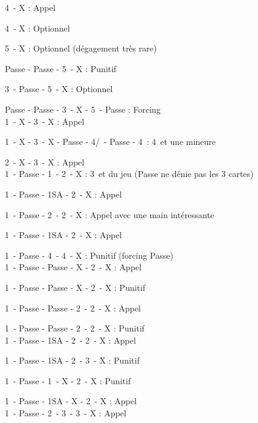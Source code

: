 \documentclass[a4paper, oneside, 11pt]{report}
\begin{document}
		4\coeur\ - X : Appel
		
		4\pique\ - X : Optionnel
		
		5\trefle\ - X : Optionnel (dégagement très rare)
		
		Passe - Passe - 5\trefle\ - X : Punitif
		
		3\trefle\ - Passe - 5\trefle\ - X : Optionnel
		
		Passe - Passe - 3\trefle\ - X - 5\trefle\ - Passe : Forcing\\
		
		1\pique\ - X - 3\pique\ - X : Appel
		
		1\pique\ - X - 3\pique\ - X - Passe - 4\trefle/\carreau\ - Passe - 4\coeur\ : 4\coeur\ et une mineure
		
		2\pique\ - X - 3\pique\ - X : Appel\\
		
		1\carreau\ - Passe - 1\coeur\ - 2\trefle\ - X : 3\coeur\ et du jeu (Passe ne dénie pas les 3 cartes)
		
		1\pique\ - Passe - 1SA - 2\trefle\ - X : Appel
		
		1\pique\ - Passe - 2\trefle\ - 2\coeur\ - X : Appel avec une main intéressante
		
		1\carreau\ - Passe - 1SA - 2\pique\ - X : Appel
		
		1\coeur\ - Passe - 4\coeur\ - 4\pique\ - X : Punitif (forcing Passe)\\
		
		1\pique\ - Passe - Passe - X - 2\pique\ - X : Appel
		
		1\pique\ - Passe - Passe - X - 2\trefle\ - X : Punitif
		
		1\pique\ - Passe - Passe - 2\coeur\ - 2\pique\ - X : Appel
		
		1\pique\ - Passe - Passe - 2\carreau\ - 2\coeur\ - X : Punitif\\
		
		1\pique\ - Passe - 1SA - 2\coeur\ - 2\pique\ - X : Appel
		
		1\pique\ - Passe - 1SA - 2\coeur\ - 3\carreau\ - X : Punitif
		
		1\carreau\ - Passe - 1\coeur\ - X - 2\carreau\ - X : Punitif
		
		1\carreau\ - Passe - 1SA - X - 2\carreau\ - X : Appel\\
		
		1\coeur\ - Passe - 2\coeur\ - 3\carreau\ - 3\coeur\ - X : Appel\\
		
\end{document}
